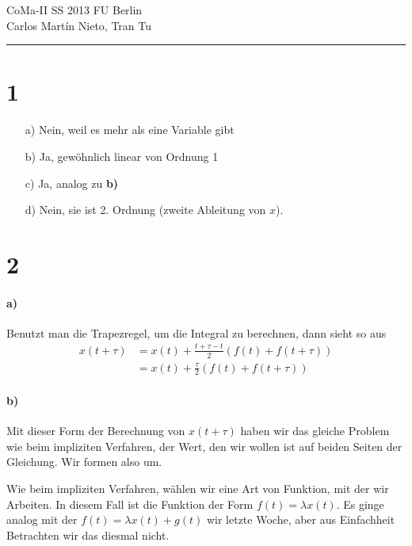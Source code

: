 \documentclass[ngerman,a4paper]{scrartcl}
\begin{document}
{\sffamily
  \hfill
  CoMa-II SS 2013\hfill
  FU Berlin\\[8pt]
  \hfill Carlos Martín Nieto, Tran Tu\hrule \bigskip
}

\section*{1}

\begin{itemize}
\item[a)] Nein, weil es mehr als eine Variable gibt
\item[b)] Ja, gewöhnlich linear von Ordnung 1
\item[c)] Ja, analog zu \textbf{b)}
\item[d)] Nein, sie ist 2. Ordnung (zweite Ableitung von $x$).
\end{itemize}
\section*{2}

\paragraph{a)}

Benutzt man die Trapezregel, um die Integral zu berechnen, dann sieht so aus
\begin{align*}
  x(t + \tau) &= x(t) + \frac{t+\tau-t}{2} (f(t) + f(t+\tau))\\
  &= x(t) + \frac{\tau}{2} (f(t) + f(t+\tau))
\end{align*}

\paragraph{b)}

Mit dieser Form der Berechnung von $x(t+\tau)$ haben wir das gleiche
Problem wie beim impliziten Verfahren, der Wert, den wir wollen ist
auf beiden Seiten der Gleichung. Wir formen also um.

Wie beim impliziten Verfahren, wählen wir eine Art von Funktion, mit
der wir Arbeiten. In diesem Fall ist die Funktion der Form $f(t) =
\lambda x(t)$. Es ginge analog mit der $f(t) = \lambda x(t) + g(t)$
wir letzte Woche, aber aus Einfachheit Betrachten wir das diesmal
nicht.
\end{document}
